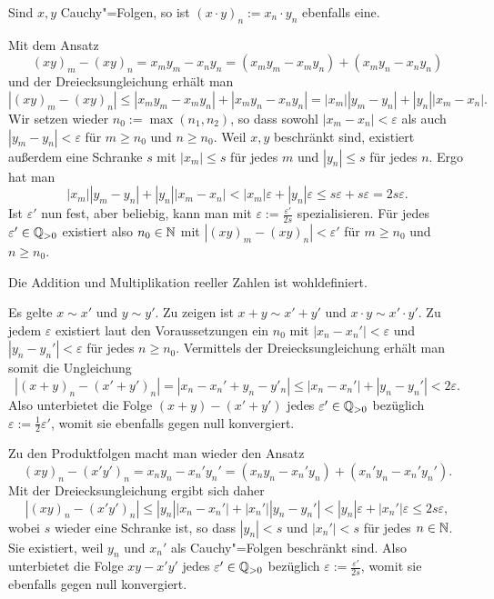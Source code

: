 \begin{Satz}
Sind $x,y$ Cauchy"=Folgen, so ist $(x\cdot y)_n := x_n\cdot y_n$ ebenfalls eine.
\end{Satz}
\begin{Beweis}
Mit dem Ansatz
\[(xy)_m - (xy)_n = x_m y_m - x_n y_n = (x_m y_m - x_m y_n) + (x_m y_n - x_n y_n)\]
und der Dreiecksungleichung erhält man
\[|(xy)_m - (xy)_n| \le |x_m y_m - x_m y_n| + |x_m y_n - x_n y_n|
= |x_m||y_m-y_n| + |y_n||x_m-x_n|.\]
Wir setzen wieder $n_0:=\max(n_1,n_2)$, so dass sowohl $|x_m-x_n|<\varepsilon$
als auch $|y_m-y_n|<\varepsilon$ für $m\ge n_0$ und $n\ge n_0$. Weil $x,y$
beschränkt sind, existiert außerdem eine Schranke $s$ mit $|x_m|\le s$
für jedes $m$ und $|y_n|\le s$ für jedes $n$. Ergo hat man
\[|x_m||y_m-y_n| + |y_n||x_m-x_n| < |x_m|\varepsilon + |y_n|\varepsilon
\le s\varepsilon + s\varepsilon = 2s\varepsilon.\]
Ist $\varepsilon'$ nun fest, aber beliebig, kann man mit
$\varepsilon:=\frac{\varepsilon'}{2s}$ spezialisieren. Für jedes $\varepsilon'\in\mathbb Q_{>0}$
existiert also $n_0\in\mathbb N$ mit $|(xy)_m - (xy)_n| < \varepsilon'$
für $m\ge n_0$ und $n\ge n_0$.\,\qedsymbol
\end{Beweis}

\begin{Satz}
Die Addition und Multiplikation reeller Zahlen ist wohldefiniert.
\end{Satz}
\begin{Beweis}
Es gelte $x\sim x'$ und $y\sim y'$. Zu zeigen ist $x+y\sim x'+y'$
und $x\cdot y\sim x'\cdot y'$. Zu jedem $\varepsilon$ existiert laut
den Voraussetzungen ein $n_0$ mit $|x_n-x_n'| < \varepsilon$
und $|y_n-y_n'|<\varepsilon$ für jedes $n\ge n_0$. Vermittels der
Dreiecksungleichung erhält man somit die Ungleichung
\[|(x+y)_n - (x'+y')_n| = |x_n-x_n' + y_n-y'_n|
\le |x_n-x_n'| + |y_n-y_n'| < 2\varepsilon.\]
Also unterbietet die Folge $(x+y)-(x'+y')$ jedes $\varepsilon'\in\mathbb Q_{>0}$
bezüglich $\varepsilon:=\tfrac{1}{2}\varepsilon'$, womit sie ebenfalls
gegen null konvergiert.

Zu den Produktfolgen macht man wieder den Ansatz
\[(xy)_n - (x'y')_n = x_n y_n - x_n' y_n' = (x_n y_n - x_n' y_n) + (x_n' y_n - x_n' y_n').\]
Mit der Dreiecksungleichung ergibt sich daher
\[|(xy)_n - (x'y')_n| \le |y_n||x_n-x_n'| + |x_n'||y_n-y_n'|
< |y_n|\varepsilon + |x_n'|\varepsilon \le 2s\varepsilon,\]
wobei $s$ wieder eine Schranke ist, so dass $|y_n|<s$ und $|x_n'|<s$ für jedes $n\in\mathbb N$.
Sie existiert, weil $y_n$ und $x_n'$ als Cauchy"=Folgen beschränkt sind.
Also unterbietet die Folge $xy-x'y'$ jedes $\varepsilon'\in\mathbb Q_{>0}$
bezüglich $\varepsilon:=\tfrac{\varepsilon'}{2s}$, womit sie ebenfalls
gegen null konvergiert.\,\qedsymbol
\end{Beweis}


